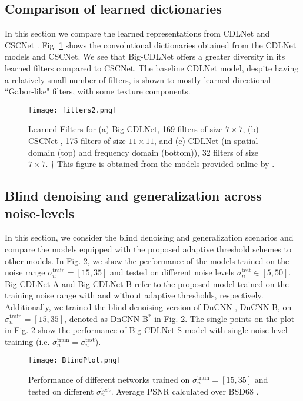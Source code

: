 \documentclass[conference]{IEEEtran}
\begin{document}
\subsection{Comparison of learned dictionaries}
In this section we compare the learned representations from CDLNet and CSCNet \cite{Simon2019}. Fig. \ref{fig:filters} shows the convolutional dictionaries obtained from the CDLNet models and CSCNet. We see that Big-CDLNet offers a greater diversity in its learned filters compared to CSCNet. The baseline CDLNet model, despite having a relatively small number of filters, is shown to mostly learned directional ``Gabor-like" filters, with some texture components.

\begin{figure}[ht]
\centering
\texttt{[image: filters2.png]}
\caption{Learned Filters for (a) Big-CDLNet, 169 filters of size $7\times 7$,  (b) CSCNet \cite{Simon2019}, 175 filters of size $11\times 11$, and (c) CDLNet (in spatial domain (top) and frequency domain (bottom)), 32 filters of size $7\times7$. $\dagger$ This figure is obtained from the models provided online by \cite{Simon2019}.}
\label{fig:filters}
\end{figure}

\subsection{Blind denoising and generalization across noise-levels} \label{sec:exp_blind}
In this section, we consider the blind denoising and generalization scenarios and compare the models equipped with the proposed adaptive threshold schemes to other models. In Fig. \ref{fig:BlindPlot}, we show the performance of the models trained on the noise range $\sigma_n^{\mathrm{train}}=[15,35]$ and tested on different noise levels $\sigma_n^{\mathrm{test}}\in[5,50]$. Big-CDLNet-A and Big-CDLNet-B refer to the proposed model trained on the training noise range with and without adaptive thresholds, respectively. Additionally, we trained the blind denoising version of DnCNN \cite{DnCNN}, DnCNN-B, on $\sigma_n^{\mathrm{train}}=[15,35]$, denoted as DnCNN-B$^\ast$ in Fig. \ref{fig:BlindPlot}. The single points on the plot in Fig. \ref{fig:BlindPlot} show the performance of Big-CDLNet-S model with single noise level training (i.e. $\sigma_n^{\mathrm{train}}=\sigma_n^{\mathrm{test}}$). 

\begin{figure}[ht]
\centering
\texttt{[image: BlindPlot.png]}
\caption{Performance of different networks trained on $\sigma_n^{\mathrm{train}}=[15,35]$ and tested on different $\sigma_n^{\mathrm{test}}$. Average PSNR calculated over BSD68 \cite{bsd}.}
\label{fig:BlindPlot}
\end{figure}
\end{document}
